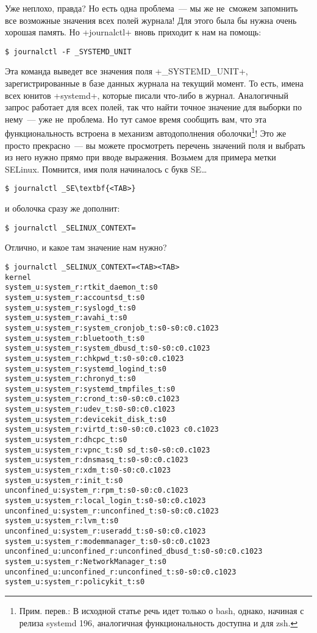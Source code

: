 \documentclass[10pt,oneside,a4paper]{article}
\begin{document}
Уже неплохо, правда? Но есть одна проблема~--- мы же не~сможем запомнить все
возможные значения всех полей журнала! Для этого была бы нужна очень хорошая
память. Но +journalctl+ вновь приходит к нам на помощь:
\begin{Verbatim}
$ journalctl -F _SYSTEMD_UNIT
\end{Verbatim}
Эта команда выведет все значения поля +_SYSTEMD_UNIT+, зарегистрированные в базе
данных журнала на текущий момент. То есть, имена всех юнитов +systemd+, которые
писали что-либо в журнал. Аналогичный запрос работает для всех полей, так что
найти точное значение для выборки по нему~--- уже не~проблема. Но тут самое
время сообщить вам, что эта функциональность встроена в механизм автодополнения
оболочки\footnote{Прим. перев.: В исходной статье речь идет только о bash,
однако, начиная с релиза systemd 196, аналогичная функциональность доступна и
для zsh.}! Это же просто прекрасно~--- вы можете просмотреть перечень значений
поля и выбрать из него нужно прямо при вводе выражения. Возьмем для примера
метки SELinux. Помнится, имя поля начиналось с букв SE\ldots{}
\begin{Verbatim}[commandchars=\\\{\}]
$ journalctl _SE\textbf{<TAB>}
\end{Verbatim}
и оболочка сразу же дополнит:
\begin{Verbatim}
$ journalctl _SELINUX_CONTEXT=	
\end{Verbatim}
Отлично, и какое там значение нам нужно?
\begin{Verbatim}[fontsize=\small]
$ journalctl _SELINUX_CONTEXT=<TAB><TAB>
kernel                                              system_u:system_r:rtkit_daemon_t:s0
system_u:system_r:accountsd_t:s0                    system_u:system_r:syslogd_t:s0
system_u:system_r:avahi_t:s0                        system_u:system_r:system_cronjob_t:s0-s0:c0.c1023
system_u:system_r:bluetooth_t:s0                    system_u:system_r:system_dbusd_t:s0-s0:c0.c1023
system_u:system_r:chkpwd_t:s0-s0:c0.c1023           system_u:system_r:systemd_logind_t:s0
system_u:system_r:chronyd_t:s0                      system_u:system_r:systemd_tmpfiles_t:s0
system_u:system_r:crond_t:s0-s0:c0.c1023            system_u:system_r:udev_t:s0-s0:c0.c1023
system_u:system_r:devicekit_disk_t:s0               system_u:system_r:virtd_t:s0-s0:c0.c1023 c0.c1023
system_u:system_r:dhcpc_t:s0                        system_u:system_r:vpnc_t:s0 sd_t:s0-s0:c0.c1023
system_u:system_r:dnsmasq_t:s0-s0:c0.c1023          system_u:system_r:xdm_t:s0-s0:c0.c1023
system_u:system_r:init_t:s0                         unconfined_u:system_r:rpm_t:s0-s0:c0.c1023
system_u:system_r:local_login_t:s0-s0:c0.c1023      unconfined_u:system_r:unconfined_t:s0-s0:c0.c1023
system_u:system_r:lvm_t:s0                          unconfined_u:system_r:useradd_t:s0-s0:c0.c1023
system_u:system_r:modemmanager_t:s0-s0:c0.c1023     unconfined_u:unconfined_r:unconfined_dbusd_t:s0-s0:c0.c1023
system_u:system_r:NetworkManager_t:s0               unconfined_u:unconfined_r:unconfined_t:s0-s0:c0.c1023
system_u:system_r:policykit_t:s0                             
\end{Verbatim}
\end{document}
